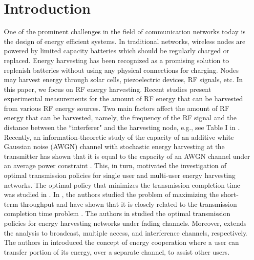 \documentclass[draftcls,12pt,onecolumn]{IEEEtran}
\begin{document}
\section{Introduction} \label{sec:Introduction}
One of the prominent challenges in the field of communication networks today is the design of energy efficient systems. In traditional networks, wireless nodes are powered by limited capacity batteries which should be regularly charged or replaced. Energy harvesting has been recognized as a promising solution to replenish batteries without using any physical connections for charging. Nodes may harvest energy through solar cells, piezoelectric devices, RF signals, etc. In this paper, we focus on RF energy harvesting. Recent studies present experimental measurements for the amount of RF energy that can be harvested from various RF energy sources. Two main factors affect the amount of RF energy that can be harvested, namely, the frequency of the RF signal and the distance between the ``interferer" and the harvesting node, e.g., see Table I in \cite{lu2014dynamic}.\\ 
\indent Recently, an information-theoretic study of the capacity of an additive white Gaussian noise (AWGN) channel with stochastic energy harvesting at the transmitter has shown that it is equal to the capacity of an AWGN channel under an average power constraint \cite{ozel2012achieving}. This, in turn, motivated the investigation of optimal transmission policies \cite{gunduz2014designing} for single user \cite{yang2012optimal,tutuncuoglu2012optimum,ozel2011transmission} and multi-user \cite{yang2012broadcasting,yang2012ma,tutuncuoglu2012sum} energy harvesting networks. The optimal policy that minimizes the transmission completion time was studied in \cite{yang2012optimal}. In \cite{tutuncuoglu2012optimum}, the authors studied the problem of maximizing the short-term throughput and have shown that it is closely related to the transmission completion time problem \cite{yang2012optimal}. The authors in \cite{ozel2011transmission} studied the optimal transmission policies for energy harvesting networks under fading channels. Moreover,  \cite{yang2012broadcasting,yang2012ma,tutuncuoglu2012sum} extends the analysis to broadcast, multiple access, and interference channels, respectively. The authors in \cite{gurakan2012energy} introduced the concept of energy cooperation where a user can transfer portion of its energy, over a separate channel, to assist other users.\\ 
\end{document}
